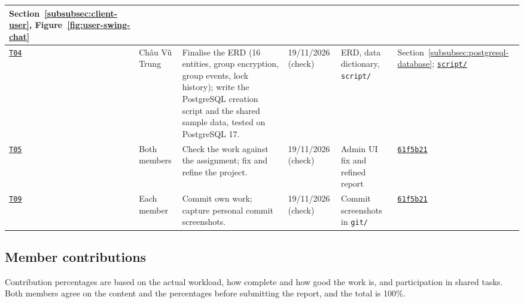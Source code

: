 \begin{center}
\begin{tabularx}{\textwidth}{|C{1.4cm}|L{2.2cm}|Y|L{2.1cm}|L{2.5cm}|L{2cm}|}
    Section~\ref{subsubsec:client-user}, Figure~\ref{fig:user-swing-chat} \\
  \hline
  \hyperlink{T04}{\texttt{T04}} & Châu Vũ Trung &
    Finalise the ERD (16 entities, group encryption, group events, lock history);
    write the PostgreSQL creation script and the shared sample data, tested on PostgreSQL 17. &
    19/11/2026 (check) & ERD, data dictionary, \texttt{script/} &
    Section~\ref{subsubsec:postgresql-database};
    \href{https://github.com/nguyenshai/Project-java/tree/main/script}{\texttt{script/}} \\
  \hline
  \hyperlink{T05}{\texttt{T05}} & Both members &
    Check the work against the assignment; fix and refine the project. &
    19/11/2026 (check) & Admin UI fix and refined report &
    \href{https://github.com/nguyenshai/Project-java/commit/61f5b213d9bb6c22e3eee75407e5196bc28f1a3e}{\texttt{61f5b21}} \\
  \hline
  \hyperlink{T09}{\texttt{T09}} & Each member &
    Commit own work; capture personal commit screenshots. &
    19/11/2026 (check) & Commit screenshots in \texttt{git/} &
    \href{https://github.com/nguyenshai/Project-java/commit/61f5b213d9bb6c22e3eee75407e5196bc28f1a3e}{\texttt{61f5b21}} \\
  \hline
\end{tabularx}
\end{center}

\clearpage
\subsection{Member contributions}
\label{subsec:contributions}

Contribution percentages are based on the actual workload, how complete and how
good the work is, and participation in shared tasks. Both members agree on the
content and the percentages before submitting the report, and the total is 100\%.


